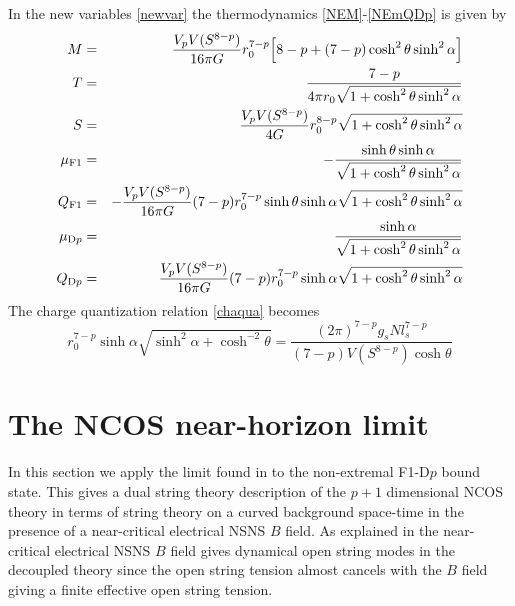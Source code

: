 \documentclass[a4paper,twoside,titlepage,12pt]{article}
\begin{document}
In the new variables \eqref{newvar} the thermodynamics
\eqref{NEM}-\eqref{NEmQDp} is given by
%
\begin{eqnarray}
\label{newM}
M &=& \frac{V_p V(S^{8-p})}{16 \pi G} r_0^{7-p}
\Big[ 8-p + (7-p) \cosh^2 \theta \sinh^2 \alpha \Big]
\\
T &=& \frac{7-p}{4 \pi r_0 \sqrt{ 1 + \cosh^2 \theta \sinh^2\alpha } }
\\
S &=& \frac{V_p V(S^{8-p})}{4 G} r_0^{8-p} \sqrt{ 1 + \cosh^2 \theta \sinh^2\alpha }
\\
\mu_{\rm F1} &=& - \frac{\sinh \theta \sinh \alpha}{\sqrt{1+\cosh^2 \theta \sinh^2 \alpha}}
\\
Q_{\rm F1} &=& - \frac{V_p V(S^{8-p})}{16 \pi G} (7-p) r_0^{7-p} \sinh \theta \sinh \alpha \sqrt{ 1+\cosh^2 \theta \sinh^2 \alpha}
\\
\mu_{{\rm D}p} &=& \frac{\sinh \alpha}{\sqrt{1+\cosh^2 \theta \sinh^2 \alpha}}
\\
\label{newQDp}
Q_{{\rm D}p} &=&  \frac{V_p V(S^{8-p})}{16 \pi G} (7-p) r_0^{7-p} \sinh \alpha \sqrt{ 1+\cosh^2 \theta \sinh^2 \alpha}
\end{eqnarray}
%
The charge quantization relation \eqref{chaqua} becomes
%
\begin{equation}
\label{newchaqua}
r_0^{7-p} \sinh \alpha \sqrt{ \sinh^2 \alpha + \cosh^{-2} \theta }  
= \frac{(2\pi)^{7-p} g_s N l_s^{7-p}}{(7-p) V( S^{8-p} ) \cosh \theta}
\end{equation}
%


\section{The NCOS near-horizon limit}
\label{secNHlimit}

In this section we apply the limit found in \cite{Gopakumar:2000na} to the 
non-extremal F1-D$p$ bound state.
This gives a dual string theory description of the $p+1$ dimensional NCOS
theory in terms of string theory on a curved background space-time in the
presence of a near-critical electrical NSNS $B$ field.
As explained in \cite{Seiberg:2000ms,Gopakumar:2000na} 
the near-critical electrical NSNS $B$ field 
gives dynamical open string modes in the decoupled theory
since the open string tension almost cancels with the $B$ field
giving a finite effective open string tension.
\end{document}
